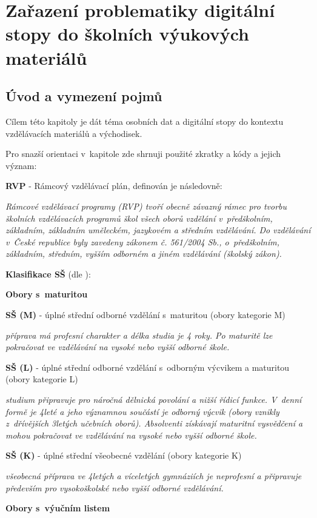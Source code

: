 \chapter{Zařazení problematiky digitální stopy do školních výukových materiálů}

\section{Úvod a vymezení pojmů}

Cílem této kapitoly je dát téma osobních dat a digitální stopy do kontextu vzdělávacích materiálů a východisek.

Pro snazší orientaci v~kapitole zde shrnuji použité zkratky a kódy a jejich význam:

\textbf{RVP} - Rámcový vzdělávací plán, definován \citep{rvp} je následovně:

\textit{Rámcové vzdělávací programy (RVP) tvoří obecně závazný rámec pro tvorbu školních vzdělávacích programů škol všech oborů vzdělání v~předškolním, základním, základním uměleckém, jazykovém a středním vzdělávání. Do vzdělávání v~České republice byly zavedeny zákonem č. 561/2004 Sb., o~předškolním, základním, středním, vyšším odborném a jiném vzdělávání (školský zákon).}

\textbf{Klasifikace SŠ} (dle \citep{stredni-vzdelavani}):

\textbf{Obory s~maturitou}

\textbf{SŠ (M)} - úplné střední odborné vzdělání s~maturitou (obory kategorie M)

\textit{příprava má profesní charakter a délka studia je 4 roky. Po maturitě lze pokračovat ve vzdělávání na vysoké nebo vyšší odborné škole.}

\textbf{SŠ (L)} - úplné střední odborné vzdělání s~odborným výcvikem a maturitou (obory kategorie L)

\textit{studium připravuje pro náročná dělnická povolání a nižší řídicí funkce. V~denní formě je 4leté a jeho významnou součástí je odborný výcvik (obory vznikly z~dřívějších 3letých učebních oborů). Absolventi získávají maturitní vysvědčení a mohou pokračovat ve vzdělávání na vysoké nebo vyšší odborné škole.}

\textbf{SŠ (K)} - úplné střední všeobecné vzdělání (obory kategorie K)

\textit{všeobecná příprava ve 4letých a víceletých gymnáziích je neprofesní a připravuje především pro vysokoškolské nebo vyšší odborné vzdělávání.}

\textbf{Obory s~výučním listem}

